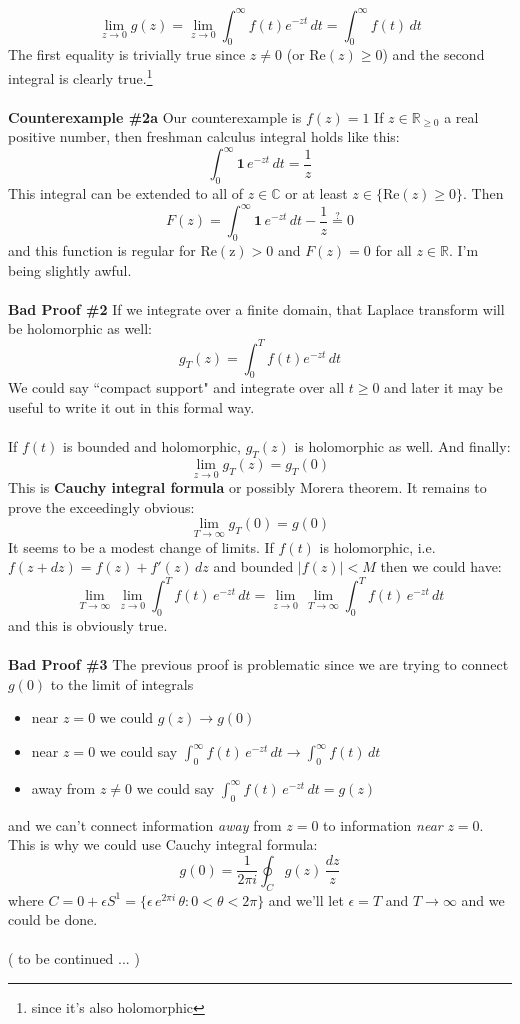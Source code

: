 \documentclass[12pt]{article}
\begin{document}
$$ \lim_{z \to 0} g(z) = \lim_{z \to 0} \int_0^\infty f(t) e^{-zt} \, dt = \int_0^\infty f(t) \, dt $$
The first equality is trivially true since $z \neq 0$ (or $\mathrm{Re}(z) \geq 0$) and the second integral is clearly true.\footnote{since it's also holomorphic} \\ \\
\textbf{Counterexample \#2a} Our counterexample is $\boxed{f(z) = 1}$ If $z \in \mathbb{R}_{\geq 0}$ a real positive number, then freshman calculus integral holds like this:
$$ \int_0^\infty \mathbf{1} \, e^{-zt} \, dt = \frac{1}{z} $$
This integral can be extended to all of $z \in \mathbb{C}$ or at least $z \in \{  \mathrm{Re}(z) \geq 0\}$.  Then
$$ F(z) = \int_0^\infty \mathbf{1} \, e^{-zt} \, dt - \frac{1}{z}  \stackrel{?}{=} 0 $$
and this function is regular for $\mathrm{Re(z)} > 0$ and $F(z) = 0$ for all $z \in \mathbb{R}$. I'm being slightly awful. \\ \\
\textbf{Bad Proof \#2} If we integrate over a finite domain, that Laplace transform will be holomorphic as well:
$$ g_T(z) = \int_0^T f(t) e^{-zt} \, dt  $$
We could say ``compact support" and integrate over all $t \geq 0$ and later it may be useful to write it out in this formal way. \\ \\
If $f(t)$ is bounded and holomorphic, $g_T(z)$ is holomorphic as well.  And finally:
$$ \lim_{z \to 0} g_T(z) = g_T(0) $$
This is \textbf{Cauchy integral formula} or possibly Morera theorem.  It remains to prove the exceedingly obvious:
$$ \lim_{T \to \infty} g_T(0) = g(0) $$
It seems to be a modest change of limits.  If $f(t)$ is holomorphic, i.e. $f(z + dz) = f(z) + f'(z) \, dz$ and bounded $|f(z)| < M$ then we could have:
$$ \lim_{T \to \infty} \, \lim_{z \to 0} \int_0^T f(t) \, e^{-zt} \, dt
= \lim_{z \to 0} \, \lim_{T \to \infty} \int_0^T f(t) \, e^{-zt} \, dt $$ 
and this is obviously true. \\ \\
\textbf{Bad Proof \#3} The previous proof is problematic since we are trying to connect $g(0)$ to the limit of integrals 
\begin{itemize}
\item near $z = 0$ we could $g(z) \to g(0) $
\item near $z = 0$ we could say  $\int_0^\infty f(t)\, e^{-zt} \, dt \to \int_0^\infty f(t) \, dt $
\item away from $z \neq 0$ we could say $\int_0^\infty f(t)\, e^{-zt} \, dt = g(z) $
\end{itemize}
and we can't connect information \textit{away} from $z = 0$ to information \textit{near} $z=0$.  This is why we could use Cauchy integral formula:
$$ g(0) = \frac{1}{2\pi i } \oint_C g(z) \, \frac{dz}{z}$$
where $C = 0 + \epsilon S^1 = \big\{ \epsilon \, e^{2\pi i} \, \theta : 0 < \theta < 2\pi \big\}$ and we'll let $\epsilon = T$ and $T \to \infty$ and we could be done. \\ \\
( to be continued ... )
\end{document}
